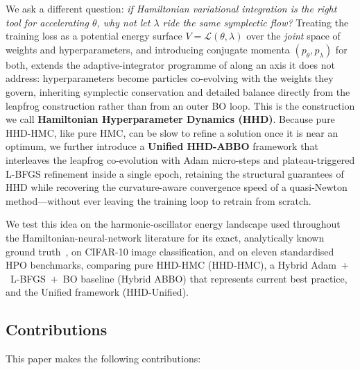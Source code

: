 \documentclass[11pt]{article}
\theoremstyle{definition}
\newcommand{\calL}{\mathcal{L}}
\begin{document}
We ask a different question: \emph{if Hamiltonian variational
integration is the right tool for accelerating $\theta$, why not let
$\lambda$ ride the same symplectic flow?} Treating the training loss
as a potential energy surface $V=\calL(\theta,\lambda)$ over the
\emph{joint} space of weights and hyperparameters, and introducing
conjugate momenta $(p_\theta,p_\lambda)$ for both, extends the
adaptive-integrator programme of \cite{duruisseaux2021adaptive} along
an axis it does not address: hyperparameters become particles
co-evolving with the weights they govern, inheriting symplectic
conservation and detailed balance directly from the leapfrog
construction rather than from an outer BO loop. This is the
construction we call \textbf{Hamiltonian Hyperparameter Dynamics
(HHD)}. Because pure HHD-HMC, like pure HMC, can be slow to refine a
solution once it is near an optimum, we further introduce a
\textbf{Unified HHD-ABBO} framework that interleaves the leapfrog
co-evolution with Adam micro-steps and plateau-triggered L-BFGS
refinement inside a single epoch, retaining the structural guarantees
of HHD while recovering the curvature-aware convergence speed of a
quasi-Newton method---without ever leaving the training loop to
retrain from scratch.

We test this idea on the harmonic-oscillator energy landscape used
throughout the Hamiltonian-neural-network literature for its exact,
analytically known ground truth~\cite{greydanus2019,zhang2025}, on
CIFAR-10 image classification, and on eleven standardised HPO
benchmarks, comparing pure HHD-HMC (HHD-HMC), a Hybrid
Adam~$+$~L-BFGS~$+$~BO baseline (Hybrid ABBO) that represents current
best practice, and the Unified framework (HHD-Unified).

\subsection{Contributions}

This paper makes the following contributions:
\end{document}
